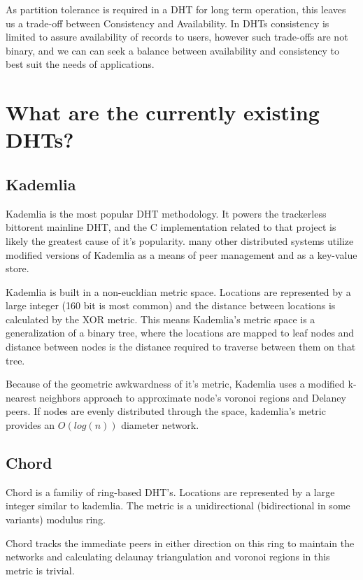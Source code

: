 As partition tolerance is required in a DHT for long term operation, this leaves us a trade-off between Consistency and Availability.
In DHTs consistency is limited to assure availability of records to users, however such trade-offs are not binary, and we can can seek a balance between availability and consistency to best suit the needs of applications.


\section{What are the currently existing DHTs?}

\subsection{Kademlia}

Kademlia is the most popular DHT methodology. 
It powers the trackerless bittorent mainline DHT, and the C implementation related to that project is likely the greatest cause of it's popularity.
many other distributed systems utilize modified versions of Kademlia as a means of peer management and as a key-value store.

Kademlia is built in a non-eucldian metric space. 
Locations are represented by a large integer (160 bit is most common) and the distance between locations is calculated by the XOR metric.
This means Kademlia's metric space is a generalization of a binary tree, where the locations are mapped to leaf nodes and distance between nodes is the distance required to traverse between them on that tree.

Because of the geometric awkwardness of it's metric, Kademlia uses a modified k-nearest neighbors approach to approximate node's voronoi regions and Delaney peers.
If nodes are evenly distributed through the space, kademlia's metric provides an $O(log(n))$ diameter network.

\subsection{Chord}

Chord is a familiy of ring-based DHT's.
Locations are represented by a large integer similar to kademlia.
The metric is a unidirectional (bidirectional in some variants) modulus ring.

Chord tracks the immediate peers in either direction on this ring to maintain the networks and calculating delaunay triangulation and voronoi regions in this metric is trivial.


